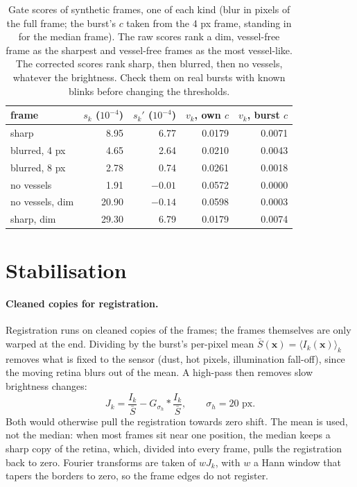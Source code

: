 \documentclass[11pt]{article}
\newcommand{\x}{\mathbf{x}}
\begin{document}
\begin{table}[H]
\centering
\begin{tabular}{@{}lrrrr@{}}
\toprule
frame & $s_k$ ($10^{-4}$) & $s_k'$ ($10^{-4}$) & $v_k$, own $c$ & $v_k$, burst $c$ \\
\midrule
sharp & 8.95 & 6.77 & 0.0179 & 0.0071 \\
blurred, 4 px & 4.65 & 2.64 & 0.0210 & 0.0043 \\
blurred, 8 px & 2.78 & 0.74 & 0.0261 & 0.0018 \\
no vessels & 1.91 & $-0.01$ & 0.0572 & 0.0000 \\
no vessels, dim & 20.90 & $-0.14$ & 0.0598 & 0.0003 \\
sharp, dim & 29.30 & 6.79 & 0.0179 & 0.0074 \\
\bottomrule
\end{tabular}
\caption{Gate scores of synthetic frames, one of each kind (blur in pixels of the full frame; the burst's $c$ taken
from the 4 px frame, standing in for the median frame). The raw scores rank a dim, vessel-free frame as the sharpest
and vessel-free frames as the most vessel-like. The corrected scores rank sharp, then blurred, then no vessels,
whatever the brightness. Check them on real bursts with known blinks before changing the thresholds.}
\label{tab:gate}
\end{table}

\section{Stabilisation}\label{sec:stab}

\paragraph{Cleaned copies for registration.} Registration runs on cleaned copies of the frames; the frames
themselves are only warped at the end. Dividing by the burst's per-pixel mean $\bar S(\x) = \langle I_k(\x)
\rangle_k$ removes what is fixed to the sensor (dust, hot pixels, illumination fall-off), since the moving retina
blurs out of the mean. A high-pass then removes slow brightness changes:
\begin{equation}
  J_k = \frac{I_k}{\bar S} - G_{\sigma_h} * \frac{I_k}{\bar S}, \qquad \sigma_h = 20 \text{ px}.
\end{equation}
Both would otherwise pull the registration towards zero shift. The mean is used, not the median: when most frames
sit near one position, the median keeps a sharp copy of the retina, which, divided into every frame, pulls the
registration back to zero. Fourier transforms are taken of $w J_k$, with $w$ a Hann window that tapers the borders
to zero, so the frame edges do not register.
\end{document}
